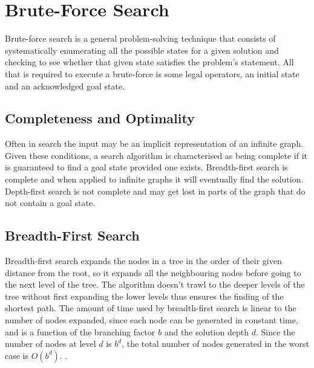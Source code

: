\documentclass[final]{cmpreport}
\begin{document}
\section{Brute-Force Search}
Brute-force search is a general problem-solving technique that consists of systematically enumerating all the possible states for a given solution and checking to see whether that given state satisfies the problem's statement. All that is required to execute a brute-force is some legal operators, an initial state and an acknowledged goal state. 
\subsection{Completeness and Optimality}
 Often in search the input may be an implicit representation of an infinite graph. Given these conditions, a search algorithm is characterised as being complete if it is guaranteed to find a goal state provided one exists. Breadth-first search is complete and when applied to infinite graphs it will eventually find the solution. Depth-first search is not complete and may get lost in parts of the graph that do not contain a goal state.
\subsection{Breadth-First Search}
Breadth-first search expands the nodes in a tree in the order of their given distance from the root, so it expands all the neighbouring nodes before going to the next level of the tree. The algorithm doesn't trawl to the deeper levels of the tree without first expanding the lower levels thus ensures the finding of the shortest path. The amount of time used by breadth-first search is linear to the number of nodes expanded, since each node can be generated in constant time, and is a function of the branching factor $b$ and the solution depth $d$. Since the number of nodes at level $d$ is $b^d$, the total number of nodes generated in the worst case is $O(b^d)$. \citep{DBLP:journals/mima/Korf95}.
\end{document}
